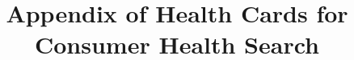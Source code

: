 \documentclass[sigconf]{acmart}
\begin{document}


\title[Health Card for CHS]{Appendix of Health Cards for Consumer Health Search}


%
%
%


\end{document}
